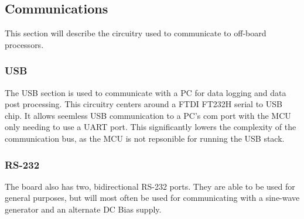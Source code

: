\subsection{Communications}

This section will describe the circuitry used to communicate to off-board processors.

\subsubsection{USB}
The USB section is used to communicate with a PC for data logging and data post processing. This circuitry centers around a FTDI FT232H serial to USB chip. It allows seemless USB communication to a PC's com port with the MCU only needing to use a UART port. This significantly lowers the complexity of the communication bus, as the MCU is not repsonible for running the USB stack.

\subsubsection{RS-232}
The board also has two, bidirectional RS-232 ports. They are able to be used for general purposes, but will most often be used for communicating with a sine-wave generator and an alternate DC Bias supply.
